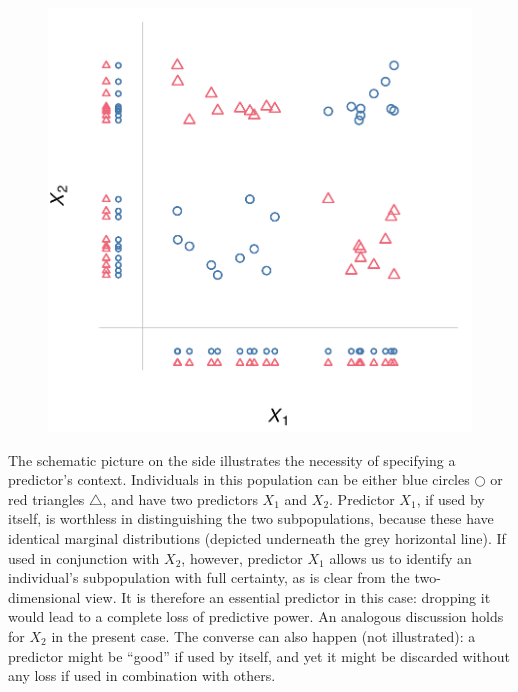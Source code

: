 \documentclass[utf8]{FrontiersinHarvard} %
\renewcommand*{\|}[1][]{\nonscript\:#1\vert\nonscript\:\mathopen{}}
\begin{document}
\setlength{\intextsep}{0ex}%
\setlength{\columnsep}{1ex}%
\begin{figure}%
\vspace{-1ex}%
\includegraphics[width=\linewidth]{example_importance_context3.pdf}%
\end{figure}%
The schematic picture on the side illustrates the necessity of specifying a predictor's context. Individuals in this population can be either \textcolor{bluepurple}{blue circles $\scriptstyle\bigcirc$} or \textcolor{redpurple}{red triangles $\triangle$}, and have two predictors $X_{1}$ and $X_{2}$. Predictor $X_{1}$, if used by itself, is worthless in distinguishing the two subpopulations, because these have identical marginal distributions (depicted underneath the grey horizontal line). If used in conjunction with $X_{2}$, however, predictor $X_{1}$ allows us to identify an individual's subpopulation with full certainty, as is clear from the two-dimensional view. It is therefore an essential predictor in this case: dropping it would lead to a complete loss of predictive power. An analogous discussion holds for $X_{2}$ in the present case. The converse can also happen (not illustrated): a predictor might be \enquote{good} if used by itself, and yet it might be discarded without any loss if used in combination with others.
\end{document}
